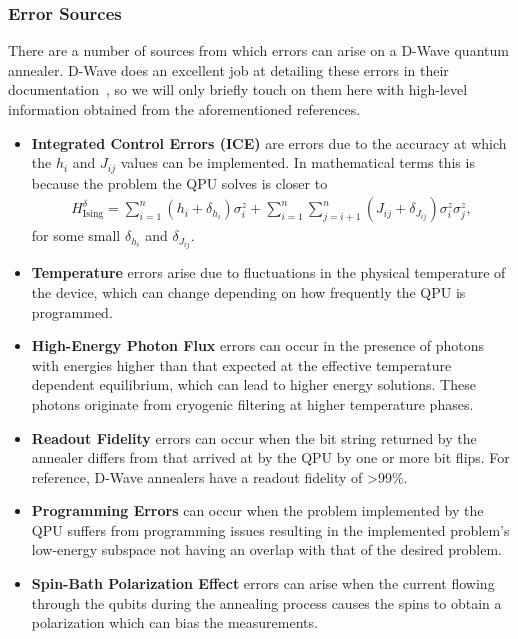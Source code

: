 \subsubsection{Error Sources}
There are a number of sources from which errors can arise on a D-Wave quantum annealer.
D-Wave does an excellent job at detailing these errors in their documentation~\cite{dwave_ice_errors,dwave_other_errors}, so we will only briefly touch on them here with high-level information obtained from the aforementioned references.
\begin{itemize}
    \item \textbf{Integrated Control Errors (ICE)} are errors due to the accuracy at which the \( h_i \) and \( J_{ij} \) values can be implemented.
        In mathematical terms this is because the problem the QPU solves is closer to
        \begin{align}
            H_{\text{Ising}}^\delta = \sum_{i=1}^{n} (h_i + \delta_{h_i}) \sigma_i^z + \sum_{i=1}^{n}\sum_{j=i+1}^n (J_{ij} + \delta_{J_{ij}}) \sigma_i^z \sigma_j^z,
        \end{align}
        for some small \( \delta_{h_i} \) and \( \delta_{J_{ij}} \).
    \item \textbf{Temperature} errors arise due to fluctuations in the physical temperature of the device, which can change depending on how frequently the QPU is programmed.
    \item \textbf{High-Energy Photon Flux} errors can occur in the presence of photons with energies higher than that expected at the effective temperature dependent equilibrium, which can lead to higher energy solutions. These photons originate from cryogenic filtering at higher temperature phases.
    \item \textbf{Readout Fidelity} errors can occur when the bit string returned by the annealer differs from that arrived at by the QPU by one or more bit flips.
        For reference, D-Wave annealers have a readout fidelity of >99\%.
    \item \textbf{Programming Errors} can occur when the problem implemented by the QPU suffers from programming issues resulting in the implemented problem's low-energy subspace not having an overlap with that of the desired problem.
    \item \textbf{Spin-Bath Polarization Effect} errors can arise when the current flowing through the qubits during the annealing process causes the spins to obtain a polarization which can bias the measurements.
\end{itemize}
